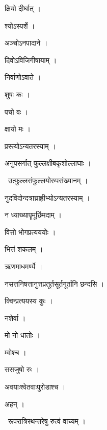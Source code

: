 \documentclass[10pt, openany, oneside]{book}
\begin{document}
\noindent क्षियो दीर्घात् ।

\noindent श्योऽस्पर्शे ।

\noindent अञ्चोऽनपादाने ।

\noindent दिवोऽविजिगीषायाम् ।

\noindent निर्वाणोऽवाते ।

\noindent शुषः कः ।

\noindent पचो वः ।

\noindent क्षायो मः ।

\noindent प्रस्त्योऽन्यतरस्याम् ।

\noindent अनुपसर्गात् फुल्लक्षीबकृशोल्लाघाः ।

\par\noindent\hspace{1.5em}{\vps वा॰}~{\qt उत्फुल्लसंफुल्लयोरुपसंख्यानम् ।}

\noindent नुदविदोन्दत्राघ्राह्रीभ्योऽन्यतरस्याम् ।

\noindent न ध्याख्यापॄमूर्छिमदाम् ।

\noindent वित्तो भोगप्रत्यययोः ।

\noindent भित्तं शकलम् ।

\noindent ऋणमाधमर्ण्ये ।

\noindent नसत्तनिषत्तानुत्तप्रतूर्तसूर्तगूर्तानि छन्दसि ।

\noindent क्विन्प्रत्ययस्य कुः ।

\noindent नशेर्वा ।

\noindent मो नो धातोः ।

\noindent म्वोश्च ।

\noindent ससजुषो रुः ।

\noindent अवयाःश्वेतवाःपुरोडाश्च ।

\noindent अहन् ।

\par\noindent\hspace{1.5em}{\vps वा॰}~{\qt रूपरात्रिरथन्तरेषु रुत्वं वाच्यम् ।}
\end{document}
